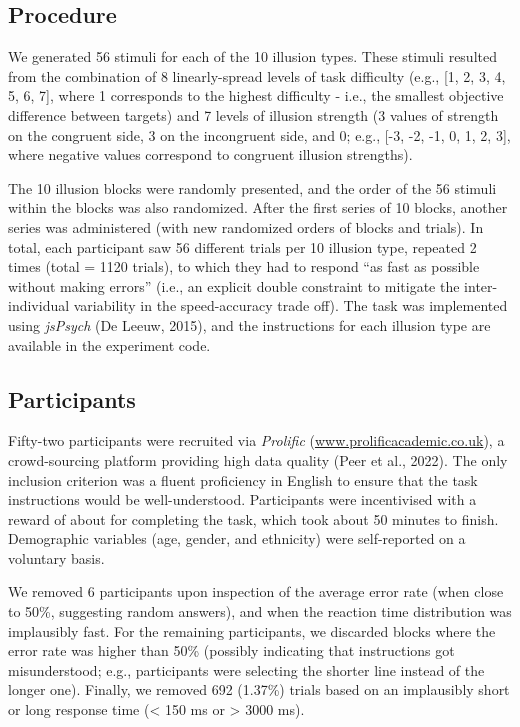 \documentclass[
  man,floatsintext]{apa6}
\begin{document}
\hypertarget{procedure}{%
\subsection{Procedure}\label{procedure}}

We generated 56 stimuli for each of the 10 illusion types. These stimuli resulted from the combination of 8 linearly-spread levels of task difficulty (e.g., {[}1, 2, 3, 4, 5, 6, 7{]}, where 1 corresponds to the highest difficulty - i.e., the smallest objective difference between targets) and 7 levels of illusion strength (3 values of strength on the congruent side, 3 on the incongruent side, and 0; e.g., {[}-3, -2, -1, 0, 1, 2, 3{]}, where negative values correspond to congruent illusion strengths).

The 10 illusion blocks were randomly presented, and the order of the 56 stimuli within the blocks was also randomized. After the first series of 10 blocks, another series was administered (with new randomized orders of blocks and trials). In total, each participant saw 56 different trials per 10 illusion type, repeated 2 times (total = 1120 trials), to which they had to respond ``as fast as possible without making errors'' (i.e., an explicit double constraint to mitigate the inter-individual variability in the speed-accuracy trade off). The task was implemented using \emph{jsPsych} (De Leeuw, 2015), and the instructions for each illusion type are available in the experiment code.

\hypertarget{participants}{%
\subsection{Participants}\label{participants}}

Fifty-two participants were recruited via \emph{Prolific} (\url{www.prolificacademic.co.uk}), a crowd-sourcing platform providing high data quality (Peer et al., 2022). The only inclusion criterion was a fluent proficiency in English to ensure that the task instructions would be well-understood. Participants were incentivised with a reward of about  for completing the task, which took about 50 minutes to finish. Demographic variables (age, gender, and ethnicity) were self-reported on a voluntary basis.

We removed 6 participants upon inspection of the average error rate (when close to 50\%, suggesting random answers), and when the reaction time distribution was implausibly fast. For the remaining participants, we discarded blocks where the error rate was higher than 50\% (possibly indicating that instructions got misunderstood; e.g., participants were selecting the shorter line instead of the longer one). Finally, we removed 692 (1.37\%) trials based on an implausibly short or long response time (\textless{} 150 ms or \textgreater{} 3000 ms).
\end{document}
